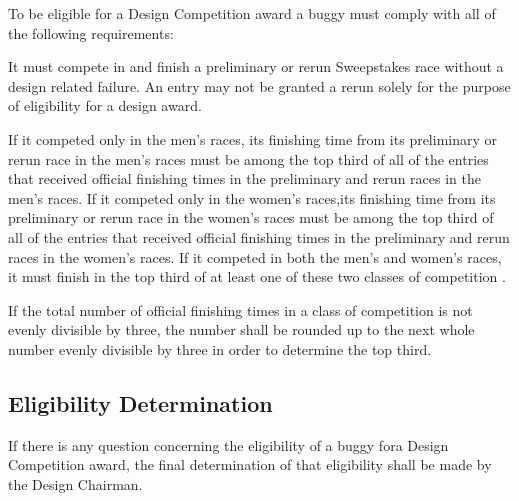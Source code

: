 To be eligible for a Design Competition award a buggy must comply with all of the following requirements:

It must compete in and finish a preliminary or rerun Sweepstakes race without a design related failure. An entry may not be granted a rerun solely for the purpose of eligibility for a design award.

If it competed only in the men's races, its finishing time from its preliminary or rerun race in the men's races must be among the top third of all of the entries that received official finishing times in the preliminary and rerun races in the men's races. If it competed only in the women's races,its finishing time from its preliminary or rerun race in the women's races must be among the top third of all of the entries that received official finishing times in the preliminary and rerun races in the women's races. If it competed in both the men's and women's races, it must finish in the top third of at least one of these two classes of competition .

If the total number of official finishing times in a class of competition is not evenly divisible by three, the number shall be rounded up to the next whole number evenly divisible by three in order to determine the top third.

\subsection{Eligibility Determination}

If there is any question concerning the eligibility of a buggy fora Design Competition award, the final determination of that eligibility shall be made by the Design Chairman.



